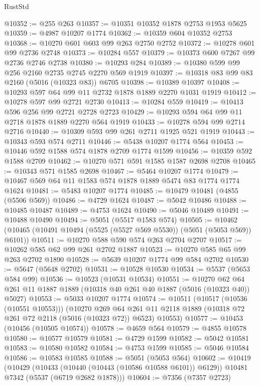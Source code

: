 \begin{lexlean}{RustStd}
\begin{coremodule}
@10352 := @255 @263
@10357 := @10351 @10352 @1878 @2753 @1953 @5625
@10359 := @4987 @10207 @1774
@10362 := @10359 @604 @10352 @2753
@10368 := @10270 @601 @603 @99 @263 @2750 @2752
@10372 := @10278 @601 @99 @2736 @2748
@10373 := @10284 @557
@10379 := @10373 @600 @7267 @99 @2736 @2746 @2738
@10380 := @10293 @284
@10389 := @10380 @599 @99 @256 @2160 @2735 @2745 @2270 @569 @1919
@10397 := @10318 @83 @99 @83 @2160 (@5016 (@10323 @83)) @6705
@10398 := @10389 @10397
@10408 := @10293 @597 @64 @99 @11 @2732 @1878 @1889 @2270 @1031 @1919
@10412 := @10278 @597 @99 @2721 @2730
@10413 := @10284 @559
@10419 := @10413 @596 @256 @99 @2721 @2728 @2723
@10429 := @10293 @594 @64 @99 @11 @2718 @1878 @1889 @2270 @564 @1919
@10433 := @10278 @594 @99 @2714 @2716
@10440 := @10309 @593 @99 @261 @2711 @1925 @521 @1919
@10443 := @10343 @593 @574 @2711
@10446 := @5438 @10207 @1774 @564
@10453 := @10446 @592 @1588 @574 @1878 @2709 @1774 @1599
@10456 := @10359 @592 @1588 @2709
@10462 := @10270 @571 @591 @1585 @1587 @2698 @2708
@10465 := @10343 @571 @1585 @2698
@10467 := @5464 @10207 @1774
@10479 := @10467 @569 @64 @11 @1583 @574 @1878 @1889 @5474 @83 @1774 @1774 @1624
@10481 := @5483 @10207 @1774
@10485 := @10479 @10481 (@4855 (@5506 @569))
@10486 := @4729 @1624
@10487 := @5042 @10486
@10488 := @10485 @10487
@10489 := @4753 @1624
@10490 := @5046 @10489
@10491 := @10488 @10490
@10494 := @5051 (@5517 @1583 @574)
@10505 := @10462 (@10465 (@10491 @10494 (@5525 (@5527 @569 @5530)) (@5051 (@5053 @569)) @6101))
@10511 := @10270 @588 @590 @574 @263 @2704 @2707
@10517 := @10262 @585 @62 @99 @261 @2702 @1887
@10523 := @10270 @585 @65 @99 @263 @2702 @1890
@10528 := @5639 @10207 @1774 @99 @584 @2702
@10530 := @5647 (@5648 @2702)
@10531 := @10528 @10530
@10534 := @5537 (@5653 @584 @99)
@10536 := @10523 (@10531 @10534)
@10551 := @10270 @62 @64 @261 @11 @1887 @1889 (@10318 @40 @261 @40 @1887 (@5016 (@10323 @40)) @5027)
@10553 := @5033 @10207 @1774
@10574 := @10511
    (@10517 (@10536 (@10551 @10553)))
    (@10270
      @269
      @64
      @261
      @11
      @2118
      @1889
      (@10318 @72 @261 @72 @2118 (@5016 (@10323 @72)) @6523)
      @10553)
@10577 := @10453 (@10456 (@10505 @10574))
@10578 := @4659 @564
@10579 := @4855 @10578
@10580 := @10577 @10579
@10581 := @4729 @1599
@10582 := @5042 @10581
@10583 := @10580 @10582
@10584 := @4753 @1599
@10585 := @5046 @10584
@10586 := @10583 @10585
@10588 := @5051 (@5053 @564)
@10602 := @10419
    (@10429
      (@10433 (@10440 (@10443 (@10586 @10588 @6101)) @6129))
      @10481
      @7342
      (@5537 (@6719 @2682 @1878)))
@10604 := @7356 (@7357 @2723)

\end{coremodule}
\end{lexlean}
